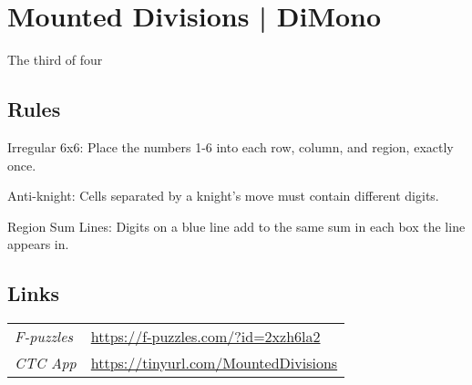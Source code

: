 \section{Mounted Divisions | {\normalfont DiMono}}
\label{sec:50-mounted-divisions-dimono}
The third of four
\subsection*{Rules}
\begin{markdown}
Irregular 6x6: Place the numbers 1-6 into each row, column, and region, exactly once.



Anti-knight: Cells separated by a knight's move must contain different digits.



Region Sum Lines: Digits on a blue line add to the same sum in each box the line appears in.
\end{markdown}
\subsection*{Links}
\begin{tabularx}{\textwidth}{l X}
\emph{F-puzzles} & \url{https://f-puzzles.com/?id=2xzh6la2} \\
\emph{CTC App} & \url{https://tinyurl.com/MountedDivisions} \\
\end{tabularx}
\pagebreak
